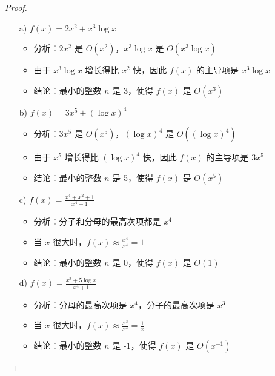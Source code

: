 \documentclass[UTF8]{report}
\theoremstyle{MyLineTheoremStyle} %
\theoremstyle{MyBlockTheoremStyle} %
\theoremstyle{MySubsubsectionStyle} %
\begin{document}
\begin{proof}
    \begin{itemize}
        \item[a)] \( f(x) = 2x^2 + x^3 \log x \)
        \begin{itemize}
            \item 分析：\( 2x^2 \) 是 \( O(x^2) \)，\( x^3 \log x \) 是 \( O(x^3 \log x) \)
            \item 由于 \( x^3 \log x \) 增长得比 \( x^2 \) 快，因此 \( f(x) \) 的主导项是 \( x^3 \log x \)
            \item 结论：最小的整数 \( n \) 是 3，使得 \( f(x) \) 是 \( O(x^3) \)
        \end{itemize}
        \item[b)] \( f(x) = 3x^5 + (\log x)^4 \)
        \begin{itemize}
            \item 分析：\( 3x^5 \) 是 \( O(x^5) \)，\( (\log x)^4 \) 是 \( O((\log x)^4) \)
            \item 由于 \( x^5 \) 增长得比 \( (\log x)^4 \) 快，因此 \( f(x) \) 的主导项是 \( 3x^5 \)
            \item 结论：最小的整数 \( n \) 是 5，使得 \( f(x) \) 是 \( O(x^5) \)
        \end{itemize}
        \item[c)] \( f(x) = \frac{x^4 + x^2 + 1}{x^4 + 1} \)
        \begin{itemize}
            \item 分析：分子和分母的最高次项都是 \( x^4 \)
            \item 当 \( x \) 很大时，\( f(x) \approx \frac{x^4}{x^4} = 1 \)
            \item 结论：最小的整数 \( n \) 是 0，使得 \( f(x) \) 是 \( O(1) \)
        \end{itemize}
        \item[d)] \( f(x) = \frac{x^3 + 5 \log x}{x^4 + 1} \)
        \begin{itemize}
            \item 分析：分母的最高次项是 \( x^4 \)，分子的最高次项是 \( x^3 \)
            \item 当 \( x \) 很大时，\( f(x) \approx \frac{x^3}{x^4} = \frac{1}{x} \)
            \item 结论：最小的整数 \( n \) 是 -1，使得 \( f(x) \) 是 \( O(x^{-1}) \)
        \end{itemize}
    \end{itemize}
\end{proof}
\end{document}
